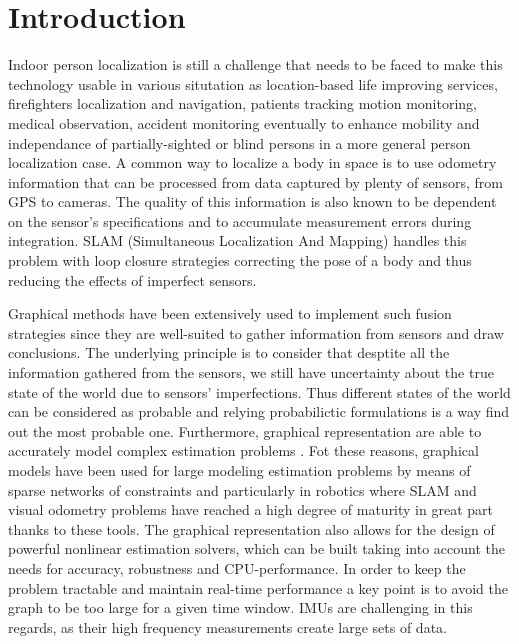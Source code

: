 
\section{Introduction}\label{sec:intro}

Indoor person localization is still a challenge that needs to be faced to make this technology usable in various situtation as location-based life improving services, firefighters localization and navigation, patients tracking 
motion monitoring, medical observation, accident monitoring \cite{pourhomayoun2012spatial} eventually to enhance mobility and independance of partially-sighted or blind persons in a more general person localization case.
A common way to localize a body in space is to use odometry information that can be processed from data captured by plenty of sensors, from GPS to cameras.
The quality of this information is also known to be dependent on the sensor's specifications and to accumulate measurement errors during integration. 
SLAM (Simultaneous Localization And Mapping) handles this problem with loop closure strategies correcting the pose of a body and thus reducing the effects of imperfect sensors.


Graphical methods have been extensively used to implement such fusion strategies \cite{Thrun:ijrr:2006,Kaess:itro:2008} since they are well-suited to gather information from sensors
and draw conclusions. The underlying principle is to consider that desptite all the information gathered from the sensors, we still have uncertainty about the true state of the world due to sensors' imperfections.
Thus different states of the world can be considered as probable and relying probabilictic formulations is a way find out the most probable one. Furthermore, graphical representation are able to accurately model 
complex estimation problems \cite{koller2009probabilistic}. 
Fot these reasons, graphical models have been used for large modeling estimation problems by means of sparse networks of constraints and particularly in
robotics where SLAM and visual odometry problems have reached a high degree of maturity in great part thanks to these tools.
The graphical representation also allows for the design of powerful nonlinear estimation solvers, which can be built taking into account the needs for accuracy, 
robustness and CPU-performance.
In order to keep the problem tractable and maintain real-time performance a key point is to avoid the graph to be too large for a given time window.
IMUs are challenging in this regards, as their high frequency measurements create large sets of data. 
 
